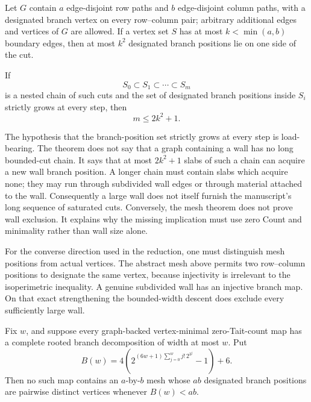 \begin{theorem}
\label{thm:mesh-isoperimetry}
Let \(G\) contain \(a\) edge-disjoint row paths and \(b\) edge-disjoint
column paths, with a designated branch vertex on every row--column pair;
arbitrary additional edges and vertices of \(G\) are allowed.  If a vertex
set \(S\) has at most \(k<\min(a,b)\) boundary edges, then at most \(k^2\)
designated branch positions lie on one side of the cut.

If
\[
 S_0\subset S_1\subset\cdots\subset S_m
\]
is a nested chain of such cuts and the set of designated branch positions
inside \(S_i\) strictly grows at every step, then
\[
                         m\le 2k^2+1.
\]
\end{theorem}

The hypothesis that the branch-position set strictly grows at every step is
load-bearing.  The theorem does not say that a graph containing a wall has no
long bounded-cut chain.  It says that at most \(2k^2+1\) slabs of such a
chain can acquire a new wall branch position.  A longer chain must contain
slabs which acquire none; they may run through subdivided wall edges or
through material attached to the wall.  Consequently a large wall does not
itself furnish the manuscript's long sequence of saturated cuts.  Conversely,
the mesh theorem does not prove wall exclusion.  It explains why the missing
implication must use zero Count and minimality rather than wall size alone.

For the converse direction used in the reduction, one must distinguish mesh
positions from actual vertices.  The abstract mesh above permits two
row--column positions to designate the same vertex, because injectivity is
irrelevant to the isoperimetric inequality.  A genuine subdivided wall has an
injective branch map.  On that exact strengthening the bounded-width descent
does exclude every sufficiently large wall.

\begin{proposition}
\label{prop:raw-width-excludes-injective-mesh}
Fix $w$, and suppose every graph-backed vertex-minimal zero-Tait-count map
has a complete rooted branch decomposition of width at most $w$.  Put
\[
 B(w)=4\left(2^{(6w+1)
       \sum_{j=0}^{w}j!\,2^{3^j}}-1\right)+6.
\]
Then no such map contains an $a$-by-$b$ mesh whose $ab$ designated
branch positions are pairwise distinct vertices whenever $B(w)<ab$.
\end{proposition}


